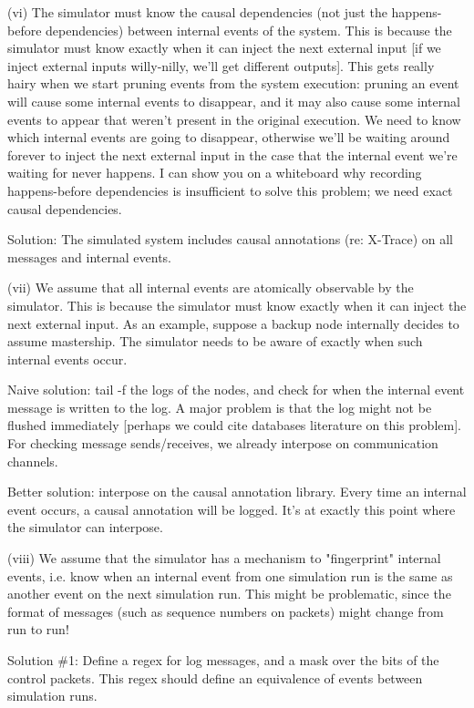 (vi) The simulator must know the causal dependencies (not just the happens-before dependencies) between internal events of the system. This is because the simulator must know exactly when it can inject the next external input [if we inject external inputs willy-nilly, we'll get different outputs]. This gets really hairy when we start pruning events from the system execution: pruning an event will cause some internal events to disappear, and it may also cause some internal events to appear that weren't present in the original execution. We need to know which internal events are going to disappear, otherwise we'll be waiting around forever to inject the next external input in the case that the internal event we're waiting for never happens. I can show you on a whiteboard why recording happens-before dependencies is insufficient to solve this problem; we need exact causal dependencies.

Solution: The simulated system includes causal annotations (re: X-Trace) on all messages and internal events. 

(vii) We assume that all internal events are atomically observable by the simulator. This is because the simulator must know exactly when it can inject the next external input. As an example, suppose a backup node internally decides to assume mastership. The simulator needs to be aware of exactly when such internal events occur.

Naive solution: tail -f the logs of the nodes, and check for when the internal event message is written to the log. A major problem is that the log might not be flushed immediately [perhaps we could cite databases literature on this problem]. For checking message sends/receives, we already interpose on communication channels.

Better solution: interpose on the causal annotation library. Every time an internal event occurs, a causal annotation will be logged. It's at exactly this point where the simulator can interpose.

(viii) We assume that the simulator has a mechanism to "fingerprint" internal events, i.e. know when an internal event from one simulation run is the same as another event on the next simulation run. This might be problematic, since the format of messages (such as sequence numbers on packets) might change from run to run!

Solution \#1: Define a regex for log messages, and a mask over the bits of the control packets. This regex should define an equivalence of events between simulation runs. 

